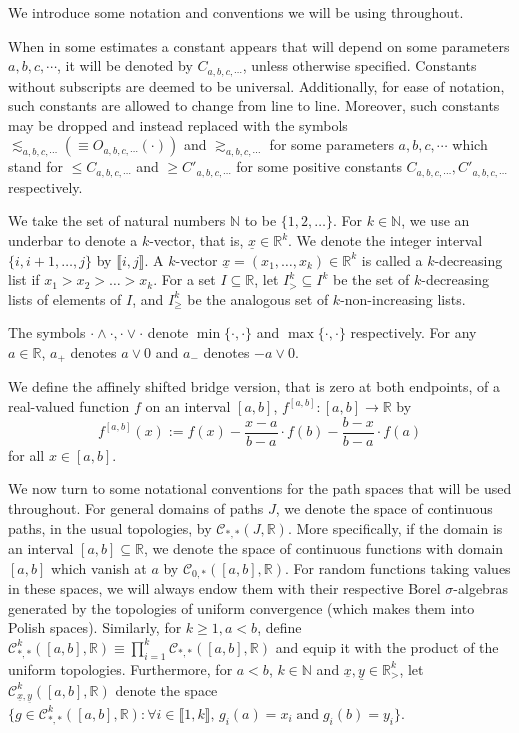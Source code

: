 \documentclass[11pt, reqno]{amsart}
\numberwithin{equation}{section}
\newcommand{\N}{\ensuremath{\mathbb{N}}}
\newcommand{\R}{\ensuremath{\mathbb{R}}}
\begin{document}
We introduce some notation and conventions we will be using throughout.

When in some estimates a constant appears that will depend on some parameters $a,b,c,\cdots$, it will be denoted by $C_{a,b,c,\cdots}$, unless otherwise specified. Constants without subscripts are deemed to be universal. Additionally, for ease of notation, such constants are allowed to change from line to line. Moreover,  such constants may be dropped and instead replaced with the symbols $\lesssim_{a,b,c,\cdots}(\equiv O_{a,b,c,\cdots}(\cdot))$ and $\gtrsim_{a,b,c,\cdots}$ for some parameters $a,b,c,\cdots$ which stand for $\le C_{a,b,c,\cdots}$ and $\ge C'_{a,b,c,\cdots}$ for some positive constants $C_{a,b,c,\cdots}, C'_{a,b,c,\cdots}$ respectively.

We take the set of natural numbers $\N$ to be $\{1,2, \ldots \}$. For $k\in \N$, we use an underbar to denote a $k$-vector, that is, $\underline{x}\in \R^k$. We denote the integer interval $\{i,i+1, \ldots, j\}$ by $\llbracket i, j\rrbracket$. A $k$-vector $\underline x = (x_1, \ldots, x_k)\in \R^k$ is called a $k$-decreasing list if $x_1>x_2> \ldots >x_k$. For a set $I\subseteq \R$, let $I^k_> \subseteq I^k$ be the set of $k$-decreasing lists of elements of $I$, and $I^k_{\geq}$ be the analogous set of $k$-non-increasing lists.

The symbols $\cdot \land \cdot , \cdot \lor \cdot$ denote $\min\{\cdot, \cdot \}$ and $\max\{\cdot, \cdot \}$ respectively. For any $a
\in \R$, $a_+$ denotes $a\lor 0$ and $a_-$ denotes $-a\lor 0$.

 We define the affinely shifted bridge version, that is zero at both endpoints, of a real-valued function $f$ on an interval $[a,b]$, $f^{[a,b]}:[a,b]\to \R$ by
%
\begin{equation}\label{eq: affine shift}
f^{[a,b]}(x) := f(x) - \frac{x-a}{b-a}\cdot f(b) - \frac{b-x}{b-a}\cdot f(a)
\end{equation}
%
for all $x\in [a,b]$. 

We now turn to some notational conventions for the path spaces that will be used throughout. For general domains of paths $J$, we denote the space of continuous paths, in the usual topologies, by $\mathscr{C}_{*,*}(J, \R)$. More specifically, if the domain is an interval $[a,b]\subseteq \R$, we denote the space of continuous functions with domain $[a,b]$ which vanish at $a$ by $\mathscr{C}_{0,*}([a,b], \R)$. For random functions taking values in these spaces, we will always endow them with their respective Borel $\sigma$-algebras generated by the topologies of uniform convergence (which makes them into Polish spaces). Similarly, for $k\ge 1, a < b$, define $\mathscr{C}^k_{*,*}([a,b], \R)\equiv \prod_{i=1}^k \mathscr{C}_{*,*}([a,b], \R)$ and equip it with the product of the uniform topologies. Furthermore, for $a<b$, $k \in \N$ and $\underline{x},\underline{y}\in \R^k_{>}$, let $\mathscr{C}^k_{\underline{x}, \underline{y}}([a,b], \R)$ denote the space $\Big\{g \in \mathscr{C}^k_{*, *}([a,b], \R): \forall i\in \llbracket 1, k\rrbracket,\,  g_{i}(a) = x_i \; \text{and}\; g_{i}(b) = y_i\Big\}$. 
\end{document}
